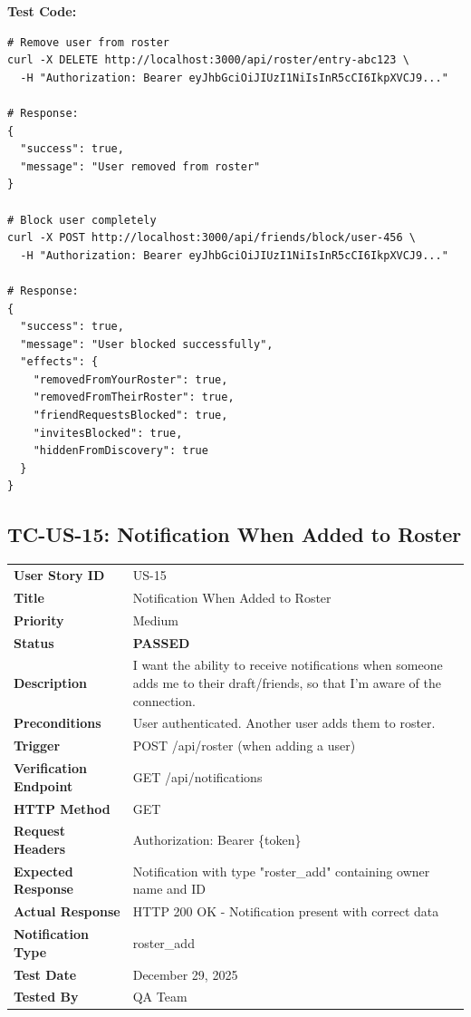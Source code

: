 \documentclass[11pt,a4paper]{article}
\newcommand{\passed}{\textcolor{pass}{\textbf{PASSED}}}
\begin{document}
\vspace{0.3cm}
\textbf{Test Code:}
\begin{lstlisting}
# Remove user from roster
curl -X DELETE http://localhost:3000/api/roster/entry-abc123 \
  -H "Authorization: Bearer eyJhbGciOiJIUzI1NiIsInR5cCI6IkpXVCJ9..."

# Response:
{
  "success": true,
  "message": "User removed from roster"
}

# Block user completely
curl -X POST http://localhost:3000/api/friends/block/user-456 \
  -H "Authorization: Bearer eyJhbGciOiJIUzI1NiIsInR5cCI6IkpXVCJ9..."

# Response:
{
  "success": true,
  "message": "User blocked successfully",
  "effects": {
    "removedFromYourRoster": true,
    "removedFromTheirRoster": true,
    "friendRequestsBlocked": true,
    "invitesBlocked": true,
    "hiddenFromDiscovery": true
  }
}
\end{lstlisting}

\vspace{0.5cm}


\subsection{TC-US-15: Notification When Added to Roster}

\begin{tabularx}{\textwidth}{|p{3.2cm}|Y|}
\hline
{}
 \\
\hline
\textbf{User Story ID} & US-15 \\
\hline
\textbf{Title} & Notification When Added to Roster \\
\hline
\textbf{Priority} & Medium \\
\hline
\textbf{Status} & \passed \\
\hline
\textbf{Description} & I want the ability to receive notifications when someone adds me to their draft/friends, so that I'm aware of the connection. \\
\hline
\textbf{Preconditions} & User authenticated. Another user adds them to roster. \\
\hline
\textbf{Trigger} & POST /api/roster (when adding a user) \\
\hline
\textbf{Verification Endpoint} & GET /api/notifications \\
\hline
\textbf{HTTP Method} & GET \\
\hline
\textbf{Request Headers} & Authorization: Bearer \{token\} \\
\hline
\textbf{Expected Response} & Notification with type "roster\_add" containing owner name and ID \\
\hline
\textbf{Actual Response} & HTTP 200 OK - Notification present with correct data \\
\hline
\textbf{Notification Type} & roster\_add \\
\hline
\textbf{Test Date} & December 29, 2025 \\
\hline
\textbf{Tested By} & QA Team \\
\hline
\end{tabularx}
\end{document}
